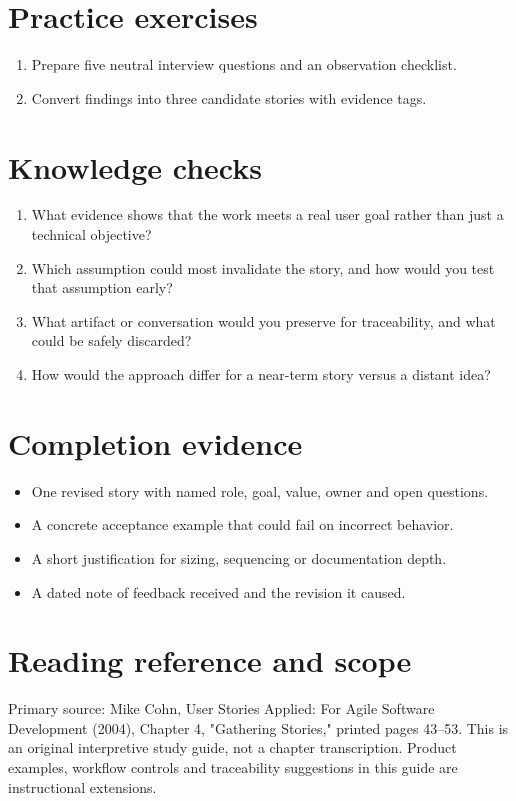 \documentclass[11pt,letterpaper]{article}
\begin{document}
\section{Practice exercises}
\begin{enumerate}[leftmargin=*,itemsep=3pt]
\item Prepare five neutral interview questions and an observation checklist.
\item Convert findings into three candidate stories with evidence tags.
\end{enumerate}
\section{Knowledge checks}
\begin{enumerate}[leftmargin=*,itemsep=3pt]
\item What evidence shows that the work meets a real user goal rather than just a technical objective?
\item Which assumption could most invalidate the story, and how would you test that assumption early?
\item What artifact or conversation would you preserve for traceability, and what could be safely discarded?
\item How would the approach differ for a near-term story versus a distant idea?
\end{enumerate}
\section{Completion evidence}
\begin{itemize}[leftmargin=*,itemsep=2pt]
\item One revised story with named role, goal, value, owner and open questions.
\item A concrete acceptance example that could fail on incorrect behavior.
\item A short justification for sizing, sequencing or documentation depth.
\item A dated note of feedback received and the revision it caused.
\end{itemize}
\section{Reading reference and scope}
Primary source: Mike Cohn, User Stories Applied: For Agile Software Development (2004), Chapter 4, "Gathering Stories," printed pages 43–53. This is an original interpretive study guide, not a chapter transcription. Product examples, workflow controls and traceability suggestions in this guide are instructional extensions.
\end{document}
